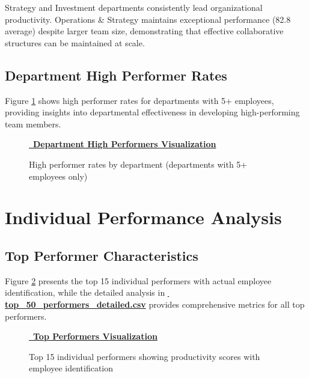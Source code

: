 \documentclass[12pt,a4paper]{article}
\newcommand{\styledimagelink}[2]{\textcolor{accentBlue}{\href{#1}{{\normalsize\faImage}\, \textbf{#2}}}}
\begin{document}
Strategy and Investment departments consistently lead organizational productivity. Operations \& Strategy maintains exceptional performance (82.8 average) despite larger team size, demonstrating that effective collaborative structures can be maintained at scale.

\subsection{Department High Performer Rates}

Figure \ref{fig:dept_high_performers} shows high performer rates for departments with 5+ employees, providing insights into departmental effectiveness in developing high-performing team members.

\begin{figure}[H]
\centering
\styledimagelink{https://fixysaskihumorizijuv.supabase.co/storage/v1/object/public/research-files/0b756176-d699-49d3-abfb-361f023f66f1-department_high_performers.png?download=}{Department High Performers Visualization}
\caption{High performer rates by department (departments with 5+ employees only)}
\label{fig:dept_high_performers}
\end{figure}

\section{Individual Performance Analysis}

\subsection{Top Performer Characteristics}

Figure \ref{fig:top_performers} presents the top 15 individual performers with actual employee identification, while the detailed analysis in \textcolor{accentGold}{\href{https://fixysaskihumorizijuv.supabase.co/storage/v1/object/public/research-files/d7107b00-7e41-4006-a14b-1bd782f73914-top_50_performers_detailed.csv?download=}{{\normalsize\faMedal}\, \textbf{top\_50\_performers\_detailed.csv}}} provides comprehensive metrics for all top performers.

\begin{figure}[H]
\centering
\styledimagelink{https://fixysaskihumorizijuv.supabase.co/storage/v1/object/public/research-files/ecb8a1f4-6868-4cae-86b1-57aac1f76224-top_15_performers.png?download=}{Top Performers Visualization}
\caption{Top 15 individual performers showing productivity scores with employee identification}
\label{fig:top_performers}
\end{figure}
\end{document}
